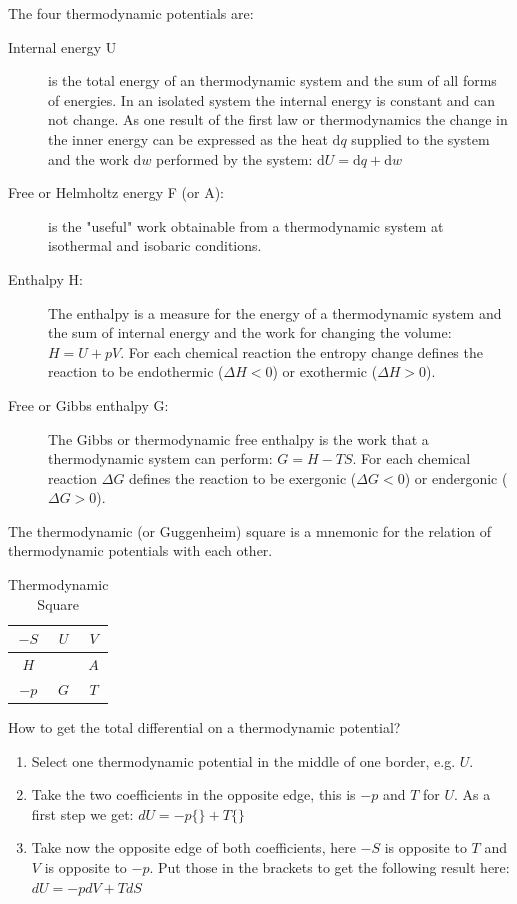 \documentclass[11pt,a4paper,english,twoside]{scrreprt}
\begin{document}
The four thermodynamic potentials are:

\begin{description}

\item[Internal energy U] is the total energy of an thermodynamic system and the sum of all forms of energies. In an isolated system the internal energy is constant and can not change. As one result of the first law or thermodynamics the change in the inner energy can be expressed as the heat $\mathrm{d}q$ supplied to the system and the work $\mathrm{d}w$ performed by the system: $\mathrm{d}U= \mathrm{d}q + \mathrm{d}w$ 

\item[Free or Helmholtz energy F (or A):] is the "useful" work obtainable from a thermodynamic system at isothermal and isobaric conditions.

\item[Enthalpy H:] The enthalpy is a measure for the energy of a thermodynamic system and the sum of internal energy and the work for changing the volume: $H = U +pV$. For each chemical reaction the entropy change defines the reaction to be endothermic ($\Delta H < 0$) or exothermic ($\Delta H > 0$).

\item[Free or Gibbs enthalpy G:] The Gibbs or thermodynamic free enthalpy is the work that a thermodynamic system can perform: $G = H - TS$. For each chemical reaction $\Delta G$ defines the reaction to be exergonic ($\Delta G < 0$) or endergonic ($\Delta G > 0$).  

\end{description}

The thermodynamic (or Guggenheim) square is a mnemonic for the relation of thermodynamic potentials with each other.

\begin{table}[htbp]
	\centering
		\begin{tabular}{|c|c|c|} \hline
		 	 $-S$ & $U$ & $V$ \\ \hline 
       $H$  &     & $A$ \\ \hline
		 	 $-p$ & $G$ & $T$ \\ \hline	
		\end{tabular}
	\caption{Thermodynamic Square}
	\label{tab:thermodynamicSquare}
\end{table}

How to get the total differential on a thermodynamic potential?
\begin{enumerate}
	\item Select one thermodynamic potential in the middle of one border, e.g. $U$.
	\item Take the two coefficients in the opposite edge, this is $-p$ and $T$ for $U$. As a first step we get: $dU = -p\{\} + T\{\}$
	\item Take now the opposite edge of both coefficients, here $-S$ is opposite to $T$ and $V$ is opposite to $-p$. Put those in the brackets to get the following result here: $dU = -pdV + TdS$
 \end{enumerate}
\end{document}

